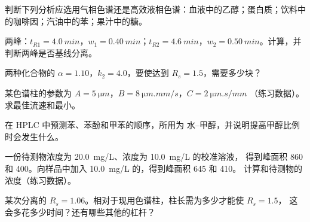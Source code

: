 \begin{exercise}[$\star$]\label{exo:b2:chromatography:4}
判断下列分析应选用气相色谱还是高效液相色谱：血液中的乙醇；蛋白质；饮料中的咖啡因；汽油中的苯；果汁中的糖。
\end{exercise}

\begin{exercise}[$\star\star$]\label{exo:b2:chromatography:5}
两峰：$t_{R1} = \qty{4.0}{min}$，$w_1 = \qty{0.40}{min}$；$t_{R2} = \qty{4.6}{min}$，$w_2 =
\qty{0.50}{min}$。计算，并判断两峰是否基线分离。
\end{exercise}

\begin{exercise}[$\star\star$]\label{exo:b2:chromatography:6}
两种化合物的 $\alpha = 1.10$，$k_2 = 4.0$，要使达到
$R_s = 1.5$，需要多少块？
\end{exercise}

\begin{exercise}[$\star\star$]\label{exo:b2:chromatography:7}
某色谱柱的参数为 $A = \qty{5}{\micro m}$，$B = \qty{8}{\micro m.mm/s}$，$C = \qty{2}{\micro m.s/mm}$
（练习数据）。求最佳流速和最小。
\end{exercise}

\begin{exercise}[$\star\star$]\label{exo:b2:chromatography:8}
在 HPLC 中预测苯、苯酚和甲苯的顺序，所用为
水–甲醇，并说明提高甲醇比例时会发生什么。
\end{exercise}

\begin{exercise}[$\star\star$]\label{exo:b2:chromatography:9}
一份待测物浓度为 \qty{20.0}{mg/L}、浓度为 \qty{10.0}{mg/L} 的校准溶液，
得到峰面积 860 和 400。向样品中加入 \qty{10.0}{mg/L} 的，得到峰面积 645 和 410。
计算和待测物的浓度（练习数据）。
\end{exercise}

\begin{exercise}[$\star\star\star$]\label{exo:b2:chromatography:10}
某次分离的 $R_s = 1.06$。相对于现用色谱柱，柱长需为多少才能使 $R_s = 1.5$，
这会多花多少时间？还有哪些其他的杠杆？
\end{exercise}

